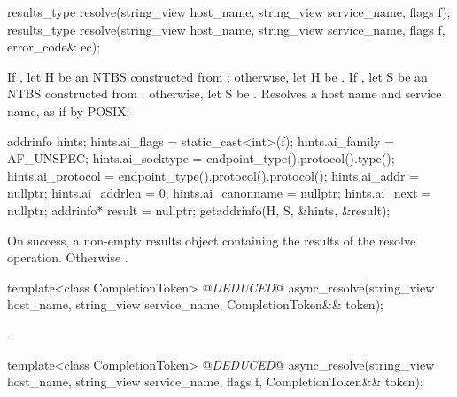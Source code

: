 \begin{itemdecl}
results_type resolve(string_view host_name, string_view service_name,
                     flags f);
results_type resolve(string_view host_name, string_view service_name,
                     flags f, error_code& ec);
\end{itemdecl}

\begin{itemdescr}
\pnum
\effects If , let H be an NTBS constructed from ; otherwise, let H be . If , let S be an NTBS constructed from ; otherwise, let S be . Resolves a host name and service name, as if by POSIX: 
\begin{codeblock}
addrinfo hints;
hints.ai_flags = static_cast<int>(f);
hints.ai_family = AF_UNSPEC;
hints.ai_socktype = endpoint_type().protocol().type();
hints.ai_protocol = endpoint_type().protocol().protocol();
hints.ai_addr = nullptr;
hints.ai_addrlen = 0;
hints.ai_canonname = nullptr;
hints.ai_next = nullptr;
addrinfo* result = nullptr;
getaddrinfo(H, S, &hints, &result);
\end{codeblock}


\pnum
\returns On success, a non-empty results object containing the results of the resolve operation. Otherwise .
\end{itemdescr}

\begin{itemdecl}
template<class CompletionToken>
  @\textit{DEDUCED}@ async_resolve(string_view host_name, string_view service_name,
                        CompletionToken&& token);
\end{itemdecl}

\begin{itemdescr}
\pnum
\returns {}.
\end{itemdescr}

\begin{itemdecl}
template<class CompletionToken>
  @\textit{DEDUCED}@ async_resolve(string_view host_name, string_view service_name,
                        flags f, CompletionToken&& token);
\end{itemdecl}

